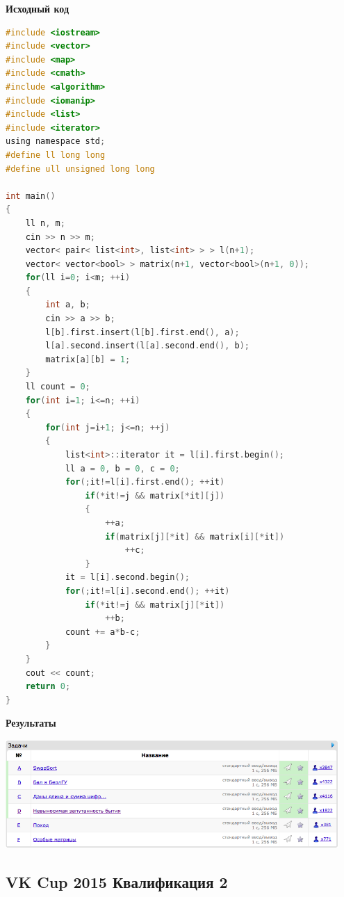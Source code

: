 \documentclass[a4paper,12pt]{article}
\begin{document}
\textbf{{\large Исходный код}}
\begin{lstlisting}[language=C]
#include <iostream>
#include <vector>
#include <map>
#include <cmath>
#include <algorithm>
#include <iomanip>
#include <list>
#include <iterator>
using namespace std;
#define ll long long
#define ull unsigned long long

int main()
{
    ll n, m;
    cin >> n >> m;
    vector< pair< list<int>, list<int> > > l(n+1);
    vector< vector<bool> > matrix(n+1, vector<bool>(n+1, 0));
    for(ll i=0; i<m; ++i)
    {
        int a, b;
        cin >> a >> b;
        l[b].first.insert(l[b].first.end(), a);
        l[a].second.insert(l[a].second.end(), b);
        matrix[a][b] = 1;
    }
    ll count = 0;
    for(int i=1; i<=n; ++i)
    {
        for(int j=i+1; j<=n; ++j)
        {
            list<int>::iterator it = l[i].first.begin();
            ll a = 0, b = 0, c = 0;
            for(;it!=l[i].first.end(); ++it)
                if(*it!=j && matrix[*it][j])
                {
                    ++a;
                    if(matrix[j][*it] && matrix[i][*it])
                        ++c;
                }
            it = l[i].second.begin();
            for(;it!=l[i].second.end(); ++it)
                if(*it!=j && matrix[j][*it])
                    ++b;
            count += a*b-c;
        }
    }
    cout << count;
    return 0;
}
\end{lstlisting}


\textbf{{\large Результаты}} \\
\begin{center}
\includegraphics[width=0.95\textwidth]{C_277_5/A_C_277_5_result.png}\\ [1cm]
\end{center}


%
%

\newpage
\subsection{VK Cup 2015 Квалификация 2}
\end{document}
